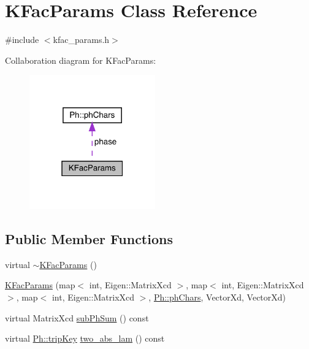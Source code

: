 \hypertarget{classKFacParams}{}\section{K\+Fac\+Params Class Reference}
\label{classKFacParams}


{\ttfamily \#include $<$kfac\+\_\+params.\+h$>$}



Collaboration diagram for K\+Fac\+Params\+:\nopagebreak
\begin{figure}[H]
\begin{center}
\leavevmode
\includegraphics[width=154pt]{dc/d62/classKFacParams__coll__graph}
\end{center}
\end{figure}
\subsection*{Public Member Functions}
\begin{DoxyCompactItemize}
\item 
virtual \mbox{\hyperlink{classKFacParams_a6fd85cbed3c5b08e892084759f12efbd}{$\sim$\+K\+Fac\+Params}} ()
\item 
\mbox{\hyperlink{classKFacParams_af8bd9e570a48e06e183f37a0dda441a4}{K\+Fac\+Params}} (map$<$ int, Eigen\+::\+Matrix\+Xcd $>$, map$<$ int, Eigen\+::\+Matrix\+Xcd $>$, map$<$ int, Eigen\+::\+Matrix\+Xcd $>$, \mbox{\hyperlink{structPh_1_1phChars}{Ph\+::ph\+Chars}}, Vector\+Xd, Vector\+Xd)
\item 
virtual Matrix\+Xcd \mbox{\hyperlink{classKFacParams_a0f22066b9390b3a28b78d9c679c71f90}{sub\+Ph\+Sum}} () const
\item 
virtual \mbox{\hyperlink{namespacePh_afdd5bf3d7b37625115089ea3048e0cbb}{Ph\+::trip\+Key}} \mbox{\hyperlink{classKFacParams_a023894ddf4ee41134ce512a2bd2a8075}{two\+\_\+abs\+\_\+lam}} () const
\end{DoxyCompactItemize}
